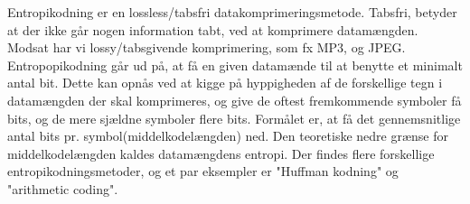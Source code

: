 Entropikodning er en lossless/tabsfri datakomprimeringsmetode. Tabsfri, betyder at der ikke går nogen information tabt, ved at komprimere datamængden. Modsat har vi lossy/tabsgivende komprimering, som fx MP3, og JPEG. Entropopikodning går ud på, at få en given datamænde til at benytte et minimalt antal bit. Dette kan opnås ved at kigge på hyppigheden af de forskellige tegn i datamængden der skal komprimeres, og give de oftest fremkommende symboler få bits, og de mere sjældne symboler flere bits. Formålet er, at få det gennemsnitlige antal bits pr. symbol(middelkodelængden) ned. Den teoretiske nedre grænse for middelkodelængden kaldes datamængdens entropi. \cite{entro1}
Der findes flere forskellige entropikodningsmetoder, og et par eksempler er "Huffman kodning" og "arithmetic coding".